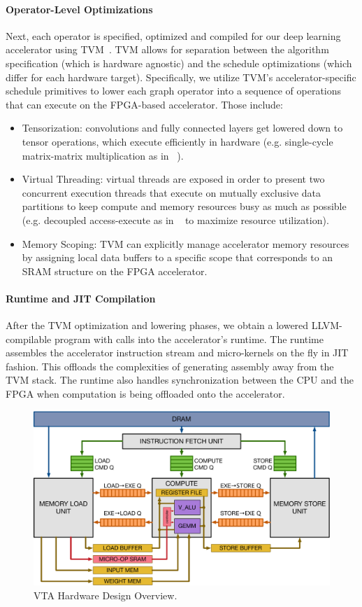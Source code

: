 \documentclass[sigconf]{acmart}
\begin{document}
\paragraph{Operator-Level Optimizations}
Next, each operator is specified, optimized and compiled for our deep learning accelerator using TVM~\cite{chen:TVM}.
TVM allows for separation between the algorithm specification (which is hardware agnostic) and the schedule optimizations (which differ for each hardware target).
Specifically, we utilize TVM's accelerator-specific schedule primitives to lower each graph operator into a sequence of operations that can execute on the FPGA-based accelerator. Those include:
\begin{itemize}
  \item Tensorization: convolutions and fully connected layers get lowered down to tensor operations, which execute efficiently in hardware (e.g. single-cycle matrix-matrix multiplication as in ~\cite{Jouppi:TPU}).
  \item Virtual Threading: virtual threads are exposed in order to present two concurrent execution threads that execute on mutually exclusive data partitions to keep compute and memory resources busy as much as possible (e.g. decoupled access-execute as in ~\cite{Smith:DAE} to maximize resource utilization).
  \item Memory Scoping: TVM can explicitly manage accelerator memory resources by assigning local data buffers to a specific scope that corresponds to an SRAM structure on the FPGA accelerator.
\end{itemize}

\paragraph{Runtime and JIT Compilation}
After the TVM optimization and lowering phases, we obtain a lowered LLVM-compilable program with calls into the accelerator's runtime.
The runtime assembles the accelerator instruction stream and micro-kernels on the fly in JIT fashion.
This offloads the complexities of generating assembly away from the TVM stack.
The runtime also handles synchronization between the CPU and the FPGA when computation is being offloaded onto the accelerator.

\begin{figure}[t]
\centering
\includegraphics[width=0.8\columnwidth]{figures/vta_overview}
\caption{VTA Hardware Design Overview.}
\label{fig:vta_overview}
\end{figure}
\end{document}
